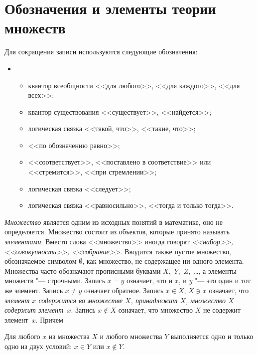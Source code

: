 \chapter{Обозначения и элементы теории множеств}

Для сокращения записи используются следующие обозначения:
\begin{itemize}
\item[]
\begin{itemize}[noitemsep, label = ---]
\item \makebox[0pt][r]{$\forall$\hspace{0.75cm}}
квантор всеобщности <<для любого>>, <<для каждого>>, <<для всех>>;
\item \makebox[0pt][r]{$\exists$\hspace{0.75cm}}
квантор существования  <<существует>>, <<найдется>>;
\item \makebox[0pt][r]{$:$\hspace{0.75cm}}
логическая связка <<такой, что>>, <<такие, что>>;
\item \makebox[0pt][r]{$\triangleq$\hspace{0.75cm}} 
<<по обозначению равно>>;
\item \makebox[0pt][r]{$\to$\hspace{0.75cm}}
<<соответствует>>, <<поставлено в соответствие>> или <<стремится>>, <<при стремлении>>;
\item \makebox[0pt][r]{$\Rightarrow$\hspace{0.75cm}}
логическая связка <<следует>>;
\item \makebox[0pt][r]{$\Longleftrightarrow$\hspace{0.75cm}}
логическая связка <<равносильно>>, <<тогда и только тогда>>.
\end{itemize}
\end{itemize}

\textit{Множество} является одним из исходных понятий в математике, оно не определяется. Множество состоит из объектов, которые принято называть \textit{элементами}. Вместо слова <<множество>> иногда говорят \textit{<<набор>>, <<совокупность>>, <<собрание>>}. Вводится также пустое множество, обозначаемое символом $\emptyset$, как множество, не содержащее ни одного элемента. Множества часто обозначают прописными буквами $X$,~$Y$,~$Z$,~\ldots, а элементы множеств "--- строчными.  Запись $x = y$ означает, что и $x$, и $y$ "--- это один и тот же элемент. Запись $x\neq y$ означает обратное. Запись $x\in X$, $X\ni x$ означает, что \textit{элемент $x$ содержится во множестве $X$, принадлежит $X$, множество $X$ содержит элемент~$x$}. Запись $x \notin X$ означает, что множество $X$ не содержит элемент~$x$. Причем
\begin{axiome}
Для любого $x$ из множества $X$ и любого множества $Y$ выполняется одно и только одно из двух условий: $x\in Y$ или $x\notin Y$.
\end{axiome}

